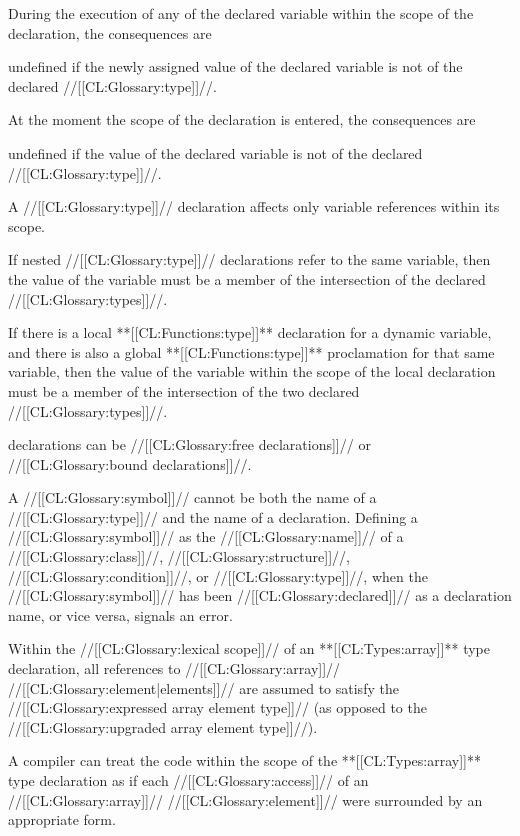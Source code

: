  During the execution of any  of the declared variable within the scope of the declaration, the consequences are

undefined if the newly assigned value of the declared variable is not of the declared //[[CL:Glossary:type]]//.

 At the moment the scope of the declaration is entered, the consequences are

undefined if the value of the declared variable is not of the declared //[[CL:Glossary:type]]//. \endlist

A //[[CL:Glossary:type]]// declaration affects only variable references within its scope.

If nested //[[CL:Glossary:type]]// declarations refer to the same variable, then the value of the variable must be a member of the intersection of the declared //[[CL:Glossary:types]]//.

If there is a local **[[CL:Functions:type]]** declaration for a dynamic variable, and there is also a global **[[CL:Functions:type]]** proclamation for that same variable, then the value of the variable within the scope of the local declaration must be a member of the intersection of the two declared //[[CL:Glossary:types]]//.


 declarations can be //[[CL:Glossary:free declarations]]// or //[[CL:Glossary:bound declarations]]//.

A //[[CL:Glossary:symbol]]// cannot be both the name of a //[[CL:Glossary:type]]// and the name of a declaration. Defining a //[[CL:Glossary:symbol]]// as the //[[CL:Glossary:name]]// of a //[[CL:Glossary:class]]//, //[[CL:Glossary:structure]]//, //[[CL:Glossary:condition]]//, or //[[CL:Glossary:type]]//, when the //[[CL:Glossary:symbol]]// has been //[[CL:Glossary:declared]]// as a declaration name, or vice versa, signals an error.


Within the //[[CL:Glossary:lexical scope]]// of an **[[CL:Types:array]]** type declaration, all references to //[[CL:Glossary:array]]// //[[CL:Glossary:element|elements]]// are assumed to satisfy the //[[CL:Glossary:expressed array element type]]// (as opposed to the //[[CL:Glossary:upgraded array element type]]//).

A compiler can treat the code within the scope of the **[[CL:Types:array]]** type declaration as if each //[[CL:Glossary:access]]// of an //[[CL:Glossary:array]]// //[[CL:Glossary:element]]// were surrounded by an appropriate  form.


